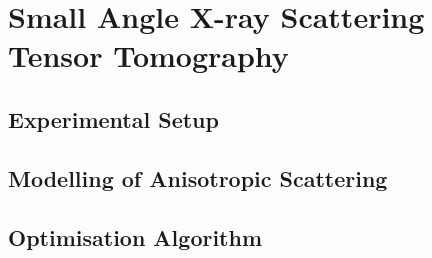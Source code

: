 \chapter{Small Angle X-ray Scattering Tensor Tomography}

\section{Experimental Setup}

\section{Modelling of Anisotropic Scattering}

\section{Optimisation Algorithm}